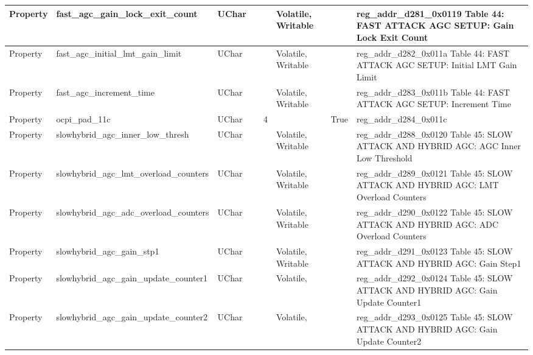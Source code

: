\documentclass{article}
\begin{document}
\begin{scriptsize}
\begin{longtable}{|p{2cm}|p{5cm}|p{1cm}|p{2cm}|p{2cm}|p{1.75cm}|p{1.5cm}|p{5.1cm}|}
  \hline
  Property & fast\_agc\_gain\_lock\_exit\_count                       & UChar &                  &                  & Volatile,  Writable &         & reg\_addr\_d281\_0x0119 Table 44: FAST ATTACK AGC SETUP: Gain Lock Exit Count \\
  \hline
  Property & fast\_agc\_initial\_lmt\_gain\_limit                     & UChar &                  &                  & Volatile,  Writable &         & reg\_addr\_d282\_0x011a Table 44: FAST ATTACK AGC SETUP: Initial LMT Gain Limit \\
  \hline
  Property & fast\_agc\_increment\_time                               & UChar &                  &                  & Volatile,  Writable &         & reg\_addr\_d283\_0x011b Table 44: FAST ATTACK AGC SETUP: Increment Time \\
  \hline
  Property & ocpi\_pad\_11c                                           & UChar &                  & 4                &                     & True    & reg\_addr\_d284\_0x011c \\
  \hline
  Property & slowhybrid\_agc\_inner\_low\_thresh                      & UChar &                  &                  & Volatile,  Writable &         & reg\_addr\_d288\_0x0120 Table 45: SLOW ATTACK AND HYBRID AGC: AGC Inner Low Threshold \\
  \hline
  Property & slowhybrid\_agc\_lmt\_overload\_counters                 & UChar &                  &                  & Volatile,  Writable &         & reg\_addr\_d289\_0x0121 Table 45: SLOW ATTACK AND HYBRID AGC: LMT Overload Counters \\
  \hline
  Property & slowhybrid\_agc\_adc\_overload\_counters                 & UChar &                  &                  & Volatile,  Writable &         & reg\_addr\_d290\_0x0122 Table 45: SLOW ATTACK AND HYBRID AGC: ADC Overload Counters \\
  \hline
  Property & slowhybrid\_agc\_gain\_stp1                              & UChar &                  &                  & Volatile,  Writable &         & reg\_addr\_d291\_0x0123 Table 45: SLOW ATTACK AND HYBRID AGC: Gain Step1 \\
  \hline
  Property & slowhybrid\_agc\_gain\_update\_counter1                  & UChar &                  &                  & Volatile,           &         & reg\_addr\_d292\_0x0124 Table 45: SLOW ATTACK AND HYBRID AGC: Gain Update Counter1 \\
  \hline
  Property & slowhybrid\_agc\_gain\_update\_counter2                  & UChar &                  &                  & Volatile,           &         & reg\_addr\_d293\_0x0125 Table 45: SLOW ATTACK AND HYBRID AGC: Gain Update Counter2 \\

\end{longtable}
\end{scriptsize}
\end{document}

